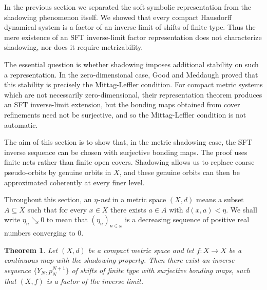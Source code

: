 \documentclass[10pt,a4paper]{amsart}
\newtheorem{theorem}{Theorem}[section]
\numberwithin{equation}{section}
\begin{document}
In the previous section we separated the soft symbolic representation from the
shadowing phenomenon itself. We showed that every compact Hausdorff dynamical
system is a factor of an inverse limit of shifts of finite type. Thus the mere
existence of an SFT inverse-limit factor representation does not characterize
shadowing, nor does it require metrizability.

The essential question is whether shadowing imposes additional stability on such
a representation. In the zero-dimensional case, Good and Meddaugh proved that
this stability is precisely the Mittag-Leffler condition. For compact metric
systems which are not necessarily zero-dimensional, their representation theorem
produces an SFT inverse-limit extension, but the bonding maps obtained from
cover refinements need not be surjective, and so the Mittag-Leffler condition is
not automatic.

The aim of this section is to show that, in the metric shadowing case, the SFT
inverse sequence can be chosen with surjective bonding maps. The proof uses
finite nets rather than finite open covers. Shadowing allows us to replace
coarse pseudo-orbits by genuine orbits in $X$, and these genuine orbits can then
be approximated coherently at every finer level. 

Throughout this section, an \emph{$\eta$-net} in a metric space $(X,d)$ means a
 subset $A\subseteq X$ such that for every $x\in X$ there exists
$a\in A$ with $d(x,a)<\eta$. We shall write $\eta_n\searrow 0$
to mean that $(\eta_n)_{n\in\omega}$ is a decreasing sequence of positive real
numbers converging to $0$.



\begin{theorem}\label{Zero-ext}
Let $(X,d)$ be a compact metric space and let $f:X\to X$ be a continuous map with the shadowing property. Then there exist an inverse sequence $\{Y_N, p^{N+1}_N\}$ of shifts of finite type with surjective bonding maps, such that $(X, f)$ is a factor of the inverse limit.
\end{theorem}
\end{document}
